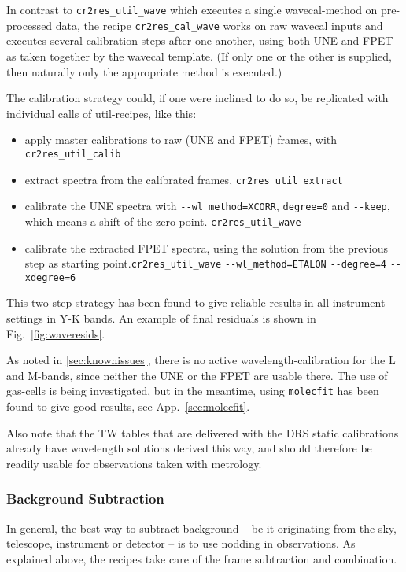 In contrast to \verb!cr2res_util_wave! which executes a single wavecal-method on
pre-processed data, the recipe \texttt{cr2res\_cal\_wave} works on raw wavecal
inputs and executes several calibration steps after one another, using both UNE
and FPET as taken together by the wavecal template. (If only one or the other is supplied, then naturally only the appropriate method is executed.)

The calibration strategy could, if one were inclined to do so, be replicated
with individual calls of util-recipes, like this:

\begin{itemize}
    \item apply master calibrations to raw (UNE and FPET) frames, with \verb!cr2res_util_calib!
    \item extract spectra from the calibrated frames, \verb!cr2res_util_extract!
    \item calibrate the UNE spectra with \verb!--wl_method=XCORR!, \verb!degree=0! and \verb!--keep!, which means a shift of the zero-point.  \verb!cr2res_util_wave!
    \item calibrate the extracted FPET spectra, using the solution from the previous step as starting point.\linebreak\verb!cr2res_util_wave! \verb!--wl_method=ETALON! \verb!--degree=4! \verb!--xdegree=6!
\end{itemize}

This two-step strategy has been found to give reliable results in all instrument
settings in Y-K bands. An example of final residuals is shown in
Fig.~\ref{fig:waveresids}.

As noted in \ref{sec:knownissues}, there is no active wavelength-calibration for
the L and M-bands, since neither the UNE or the FPET are usable there. The use
of gas-cells is being investigated, but in the meantime, using \verb!molecfit!
has been found to give good results, see App.~\ref{sec:molecfit}.

Also note that the TW tables that are delivered with the DRS static calibrations
already have wavelength solutions derived this way, and should therefore be
readily usable for observations taken with metrology.


\subsubsection{Background Subtraction}
\label{sec:backgr}

In general, the best way to subtract background  --  be it originating from the
sky, telescope, instrument or detector  --  is to use nodding in observations.
As explained above, the recipes take care of the frame subtraction and
combination.

